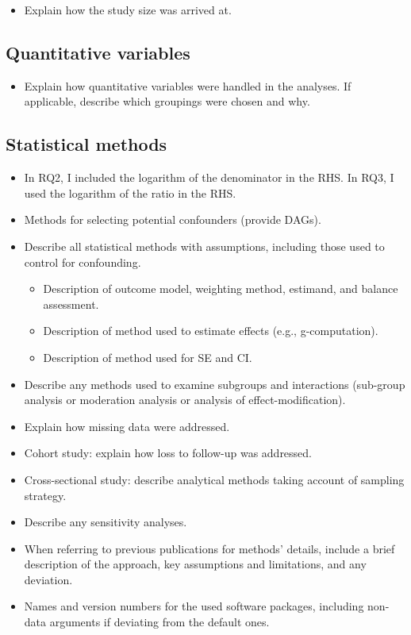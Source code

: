\documentclass[
  letterpaper,
  DIV=11,
  numbers=noendperiod]{scrartcl}
\providecommand{\tightlist}{%
  \setlength{\itemsep}{0pt}\setlength{\parskip}{0pt}}\usepackage{longtable,booktabs,array}
\begin{document}
\begin{itemize}
\tightlist
\item
  Explain how the study size was arrived at.
\end{itemize}

\subsection{Quantitative variables}\label{sec-quant-vars}

\begin{itemize}
\tightlist
\item
  Explain how quantitative variables were handled in the analyses. If
  applicable, describe which groupings were chosen and why.
\end{itemize}

\subsection{Statistical methods}\label{sec-stat-methods}

\begin{itemize}
\item
  In RQ2, I included the logarithm of the denominator in the RHS. In
  RQ3, I used the logarithm of the ratio in the RHS.
\item
  Methods for selecting potential confounders (provide DAGs).
\item
  Describe all statistical methods with assumptions, including those
  used to control for confounding.

  \begin{itemize}
  \tightlist
  \item
    Description of outcome model, weighting method, estimand, and
    balance assessment.
  \item
    Description of method used to estimate effects (e.g.,
    g-computation).
  \item
    Description of method used for SE and CI.
  \end{itemize}
\item
  Describe any methods used to examine subgroups and interactions
  (sub-group analysis or moderation analysis or analysis of
  effect-modification).
\item
  Explain how missing data were addressed.
\item
  Cohort study: explain how loss to follow-up was addressed.
\item
  Cross-sectional study: describe analytical methods taking account of
  sampling strategy.
\item
  Describe any sensitivity analyses.
\item
  When referring to previous publications for methods' details, include
  a brief description of the approach, key assumptions and limitations,
  and any deviation.
\item
  Names and version numbers for the used software packages, including
  non-data arguments if deviating from the default ones.
\end{itemize}
\end{document}
